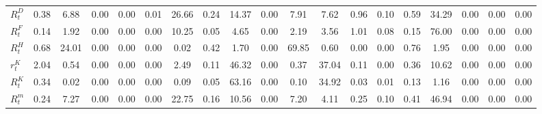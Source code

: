\begin{center}
\begin{longtable}{lcccccccccccccccccc}
$  R^D_t            $	 & 	             0.38	 & 	             6.88	 & 	             0.00	 & 	             0.00	 & 	             0.01	 & 	            26.66	 & 	             0.24	 & 	            14.37	 & 	             0.00	 & 	             7.91	 & 	             7.62	 & 	             0.96	 & 	             0.10	 & 	             0.59	 & 	            34.29	 & 	             0.00	 & 	             0.00	 & 	             0.00 \\ 
$ R^F_t             $	 & 	             0.14	 & 	             1.92	 & 	             0.00	 & 	             0.00	 & 	             0.00	 & 	            10.25	 & 	             0.05	 & 	             4.65	 & 	             0.00	 & 	             2.19	 & 	             3.56	 & 	             1.01	 & 	             0.08	 & 	             0.15	 & 	            76.00	 & 	             0.00	 & 	             0.00	 & 	             0.00 \\ 
$   R^H_t           $	 & 	             0.68	 & 	            24.01	 & 	             0.00	 & 	             0.00	 & 	             0.00	 & 	             0.02	 & 	             0.42	 & 	             1.70	 & 	             0.00	 & 	            69.85	 & 	             0.60	 & 	             0.00	 & 	             0.00	 & 	             0.76	 & 	             1.95	 & 	             0.00	 & 	             0.00	 & 	             0.00 \\ 
$ r^K_t             $	 & 	             2.04	 & 	             0.54	 & 	             0.00	 & 	             0.00	 & 	             0.00	 & 	             2.49	 & 	             0.11	 & 	            46.32	 & 	             0.00	 & 	             0.37	 & 	            37.04	 & 	             0.11	 & 	             0.00	 & 	             0.36	 & 	            10.62	 & 	             0.00	 & 	             0.00	 & 	             0.00 \\ 
$  R^K_t            $	 & 	             0.34	 & 	             0.02	 & 	             0.00	 & 	             0.00	 & 	             0.00	 & 	             0.09	 & 	             0.05	 & 	            63.16	 & 	             0.00	 & 	             0.10	 & 	            34.92	 & 	             0.03	 & 	             0.01	 & 	             0.13	 & 	             1.16	 & 	             0.00	 & 	             0.00	 & 	             0.00 \\ 
$  R^m_t            $	 & 	             0.24	 & 	             7.27	 & 	             0.00	 & 	             0.00	 & 	             0.00	 & 	            22.75	 & 	             0.16	 & 	            10.56	 & 	             0.00	 & 	             7.20	 & 	             4.11	 & 	             0.25	 & 	             0.10	 & 	             0.41	 & 	            46.94	 & 	             0.00	 & 	             0.00	 & 	             0.00 \\ 

\end{longtable}
\end{center}
